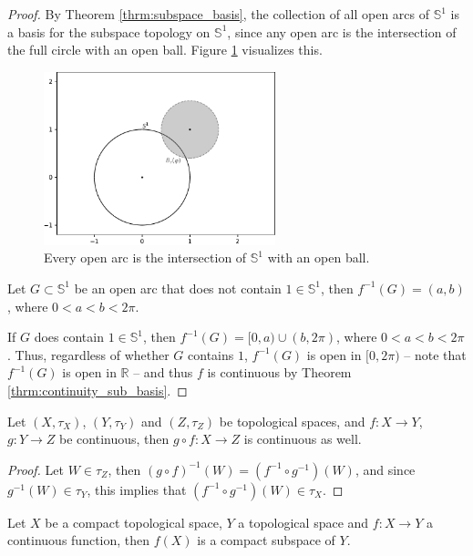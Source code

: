 \begin{proof}
	By Theorem \ref{thrm:subspace_basis}, the collection of all open arcs of $\mathbb S^1$ is a basis for the subspace topology on $\mathbb S^1$, since any open arc is the intersection of the full circle with an open ball. Figure \ref{fig:open_arc} visualizes this.
	\begin{figure}[h]
		\centering
		\includegraphics[width=0.6\textwidth]{Figures/circles_intersection_arc.pdf}
		\caption{Every open arc is the intersection of $\mathbb S^1$ with an open ball.}
		\label{fig:open_arc}
	\end{figure}
	
	Let $G\subset \mathbb S^1$ be an open arc that does not contain $1\in \mathbb S^1$, then $f^{-1}(G) = (a, b)$, where $0 < a < b < 2\pi$. 
	
	If $G$ does contain $1\in\mathbb S^1$, then $f^{-1}(G) = [0, a) \cup (b, 2\pi)$, where $0 < a < b < 2\pi$. Thus, regardless of whether $G$ contains $1$, $f^{-1}(G)$ is open in $[0, 2\pi)$ -- note that $f^{-1}(G)$ is open in $\mathbb R$ -- and thus $f$ is continuous by Theorem \ref{thrm:continuity_sub_basis}.
\end{proof}

\begin{theorem}\label{thrm:composition_continuous_functions}
	Let $(X, \tau_X)$, $(Y, \tau_Y)$ and $(Z, \tau_Z)$ be topological spaces, and $f: X\to Y$, $g: Y\to Z$ be continuous, then $g\circ f: X\to Z$ is continuous as well.
\end{theorem}

\begin{proof}
	Let $W\in\tau_Z$, then $(g\circ f)^{-1}(W) = (f^{-1}\circ g^{-1})(W)$, and since $g^{-1}(W)\in \tau_Y$, this implies that $(f^{-1}\circ g^{-1})(W)\in\tau_X$.
\end{proof}

\begin{theorem}\label{thrm:image_of_cont_func_on_comp_top_space_is_compact}
	Let $X$ be a compact topological space, $Y$ a topological space and $f: X\to Y$ a continuous function, then $f(X)$ is a compact subspace of $Y$.
\end{theorem}

